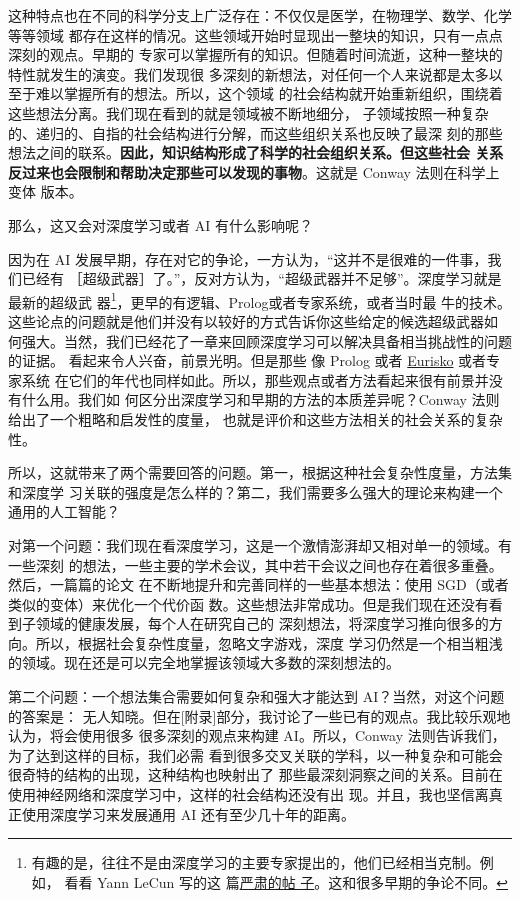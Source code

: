 这种特点也在不同的科学分支上广泛存在：不仅仅是医学，在物理学、数学、化学等等领域
都存在这样的情况。这些领域开始时显现出一整块的知识，只有一点点深刻的观点。早期的
专家可以掌握所有的知识。但随着时间流逝，这种一整块的特性就发生的演变。我们发现很
多深刻的新想法，对任何一个人来说都是太多以至于难以掌握所有的想法。所以，这个领域
的社会结构就开始重新组织，围绕着这些想法分离。我们现在看到的就是领域被不断地细分，
子领域按照一种复杂的、递归的、自指的社会结构进行分解，而这些组织关系也反映了最深
刻的那些想法之间的联系。\textbf{因此，知识结构形成了科学的社会组织关系。但这些社会
  关系反过来也会限制和帮助决定那些可以发现的事物}。这就是 Conway 法则在科学上变体
版本。

那么，这又会对深度学习或者 AI 有什么影响呢？

因为在 AI 发展早期，存在对它的争论，一方认为，“这并不是很难的一件事，我们已经有
［超级武器］了。”，反对方认为，“超级武器并不足够”。深度学习就是最新的超级武
器\footnote{有趣的是，往往不是由深度学习的主要专家提出的，他们已经相当克制。例如，
  看看 Yann LeCun 写的这
  篇\href{https://www.facebook.com/yann.lecun/posts/10152348155137143}{严肃的帖
    子}。这和很多早期的争论不同。}，更早的有逻辑、Prolog或者专家系统，或者当时最
牛的技术。这些论点的问题就是他们并没有以较好的方式告诉你这些给定的候选超级武器如
何强大。当然，我们已经花了一章来回顾深度学习可以解决具备相当挑战性的问题的证据。
看起来令人兴奋，前景光明。但是那些
像 Prolog 或者 \href{http://en.wikipedia.org/wiki/Eurisko}{Eurisko} 或者专家系统
在它们的年代也同样如此。所以，那些观点或者方法看起来很有前景并没有什么用。我们如
何区分出深度学习和早期的方法的本质差异呢？Conway 法则给出了一个粗略和启发性的度量，
也就是评价和这些方法相关的社会关系的复杂性。

所以，这就带来了两个需要回答的问题。第一，根据这种社会复杂性度量，方法集和深度学
习关联的强度是怎么样的？第二，我们需要多么强大的理论来构建一个通用的人工智能？

对第一个问题：我们现在看深度学习，这是一个激情澎湃却又相对单一的领域。有一些深刻
的想法，一些主要的学术会议，其中若干会议之间也存在着很多重叠。然后，一篇篇的论文
在不断地提升和完善同样的一些基本想法：使用 SGD（或者类似的变体）来优化一个代价函
数。这些想法非常成功。但是我们现在还没有看到子领域的健康发展，每个人在研究自己的
深刻想法，将深度学习推向很多的方向。所以，根据社会复杂性度量，忽略文字游戏，深度
学习仍然是一个相当粗浅的领域。现在还是可以完全地掌握该领域大多数的深刻想法的。

第二个问题：一个想法集合需要如何复杂和强大才能达到 AI？当然，对这个问题的答案是：
无人知晓。但在[附录]部分，我讨论了一些已有的观点。我比较乐观地认为，将会使用很多
很多深刻的观点来构建 AI。所以，Conway 法则告诉我们，为了达到这样的目标，我们必需
看到很多交叉关联的学科，以一种复杂和可能会很奇特的结构的出现，这种结构也映射出了
那些最深刻洞察之间的关系。目前在使用神经网络和深度学习中，这样的社会结构还没有出
现。并且，我也坚信离真正使用深度学习来发展通用 AI 还有至少几十年的距离。

